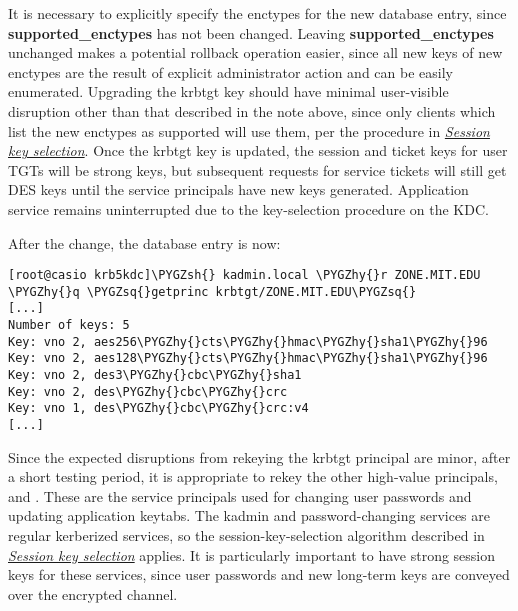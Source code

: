 \documentclass[letterpaper,10pt,english]{sphinxmanual}
\def\PYGZsh{\char`\#}
\def\PYGZhy{\char`\-}
\def\PYGZsq{\char`\'}
\begin{document}
It is necessary to explicitly specify the enctypes for the new database
entry, since \textbf{supported\_enctypes} has not been changed.  Leaving
\textbf{supported\_enctypes} unchanged makes a potential rollback operation
easier, since all new keys of new enctypes are the result of explicit
administrator action and can be easily enumerated.
Upgrading the krbtgt key should have minimal user-visible disruption other
than that described in the note above, since only clients which list the
new enctypes as supported will use them, per the procedure
in {\hyperref[admin/enctypes:session-key-selection]{\emph{Session key selection}}}.
Once the krbtgt key is updated, the session and ticket keys for user
TGTs will be strong keys, but subsequent requests
for service tickets will still get DES keys until the service principals
have new keys generated.  Application service
remains uninterrupted due to the key-selection procedure on the KDC.

After the change, the database entry is now:

\begin{Verbatim}[commandchars=\\\{\}]
[root@casio krb5kdc]\PYGZsh{} kadmin.local \PYGZhy{}r ZONE.MIT.EDU \PYGZhy{}q \PYGZsq{}getprinc krbtgt/ZONE.MIT.EDU\PYGZsq{}
[...]
Number of keys: 5
Key: vno 2, aes256\PYGZhy{}cts\PYGZhy{}hmac\PYGZhy{}sha1\PYGZhy{}96
Key: vno 2, aes128\PYGZhy{}cts\PYGZhy{}hmac\PYGZhy{}sha1\PYGZhy{}96
Key: vno 2, des3\PYGZhy{}cbc\PYGZhy{}sha1
Key: vno 2, des\PYGZhy{}cbc\PYGZhy{}crc
Key: vno 1, des\PYGZhy{}cbc\PYGZhy{}crc:v4
[...]
\end{Verbatim}

Since the expected disruptions from rekeying the krbtgt principal are
minor, after a short testing period, it is
appropriate to rekey the other high-value principals, 
and . These are the service principals used for
changing user passwords and updating application keytabs.  The kadmin
and password-changing services are regular kerberized services, so the
session-key-selection algorithm described in {\hyperref[admin/enctypes:session-key-selection]{\emph{Session key selection}}}
applies.  It is particularly important to have strong session keys for
these services, since user passwords and new long-term keys are conveyed
over the encrypted channel.
\end{document}
